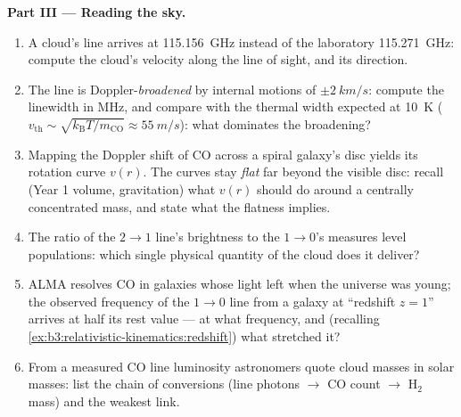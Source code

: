 \begin{problem}
\medskip\noindent\textbf{Part III --- Reading the sky.}
\begin{enumerate}[resume]
  \item A cloud's line arrives at \qty{115.156}{GHz} instead of the
        laboratory \qty{115.271}{GHz}: compute the cloud's velocity
        along the line of sight, and its direction.
  \item The line is Doppler-\emph{broadened} by internal motions of
        $\pm\qty{2}{km/s}$: compute the linewidth in MHz, and
        compare with the thermal width expected at \qty{10}{K}
        ($v_{\text{th}} \sim \sqrt{k_{\text{B}}T/m_{\text{CO}}}
        \approx \qty{55}{m/s}$): what dominates the broadening?
  \item Mapping the Doppler shift of CO across a spiral galaxy's
        disc yields its rotation curve $v(r)$. The curves stay
        \emph{flat} far beyond the visible disc: recall (Year 1
        volume, gravitation) what $v(r)$ should do around a
        centrally concentrated mass, and state what the flatness
        implies.
  \item The ratio of the $2\to1$ line's brightness to the
        $1\to0$'s measures level populations: which single physical
        quantity of the cloud does it deliver?
  \item ALMA resolves CO in galaxies whose light left when the
        universe was young; the observed frequency of the
        $1 \to 0$ line from a galaxy at ``redshift $z = 1$''
        arrives at half its rest value --- at what frequency, and
        (recalling \cref{ex:b3:relativistic-kinematics:redshift})
        what stretched it?
  \item From a measured CO line luminosity astronomers quote cloud
        masses in solar masses: list the chain of conversions (line
        photons $\to$ CO count $\to$ H$_2$ mass) and the weakest
        link.
\end{enumerate}


\end{problem}
